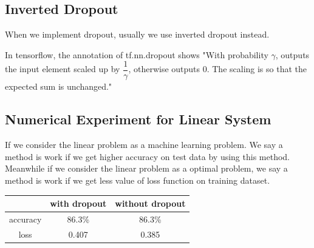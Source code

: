 \subsection{Inverted Dropout}


When we implement dropout, usually we use inverted dropout instead.

In tensorflow, the annotation of tf.nn.dropout shows "With probability $\gamma$, outputs the input element scaled up by $\dfrac{1}{\gamma}$, otherwise outputs 0. The scaling is so that the expected sum is unchanged."


\subsection{Numerical Experiment for Linear System}
If we consider the linear problem as a machine learning problem. We say a method is work if we get higher accuracy on test data by using this method.  Meanwhile if we consider the linear problem as a optimal problem, we say a method is work if we get less value of loss function on training dataset.


\begin{table}
	\begin{tabular}{c|c|c}
		&with dropout& without dropout\\\hline
		accuracy&86.3\%&86.3\%\\\hline
		loss &0.407&0.385\\\hline
	\end{tabular}
\end{table}
